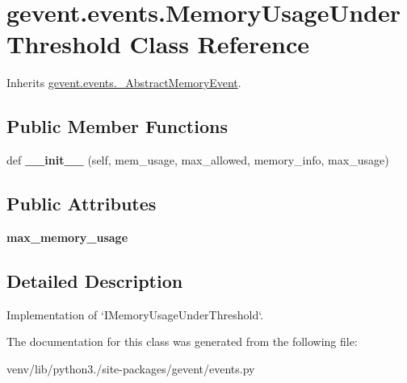 \hypertarget{classgevent_1_1events_1_1_memory_usage_under_threshold}{}\section{gevent.\+events.\+Memory\+Usage\+Under\+Threshold Class Reference}
\label{classgevent_1_1events_1_1_memory_usage_under_threshold}


Inherits \hyperlink{classgevent_1_1events_1_1___abstract_memory_event}{gevent.\+events.\+\_\+\+Abstract\+Memory\+Event}.

\subsection*{Public Member Functions}
\begin{DoxyCompactItemize}
\item 
\mbox{\label{classgevent_1_1events_1_1_memory_usage_under_threshold_a9c0d2f2e40b32ee199fa0cd58cfea225}} 
def {\bfseries \+\_\+\+\_\+init\+\_\+\+\_\+} (self, mem\+\_\+usage, max\+\_\+allowed, memory\+\_\+info, max\+\_\+usage)
\end{DoxyCompactItemize}
\subsection*{Public Attributes}
\begin{DoxyCompactItemize}
\item 
\mbox{\label{classgevent_1_1events_1_1_memory_usage_under_threshold_aa10d641057782a4100d29c174b2f6866}} 
{\bfseries max\+\_\+memory\+\_\+usage}
\end{DoxyCompactItemize}


\subsection{Detailed Description}
\begin{DoxyVerb}Implementation of `IMemoryUsageUnderThreshold`.
\end{DoxyVerb}
 

The documentation for this class was generated from the following file\+:\begin{DoxyCompactItemize}
\item 
venv/lib/python3./site-\/packages/gevent/events.\+py\end{DoxyCompactItemize}
